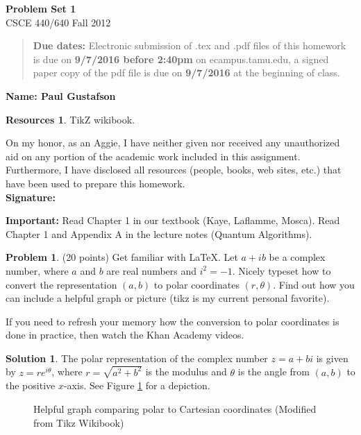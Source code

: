 \documentclass{article}
\theoremstyle{definition}
\newtheorem{problem}{Problem}
\newtheorem*{solution}{Solution}
\newtheorem*{resources}{Resources}
\newcommand{\name}[1]{\noindent\textbf{Name: #1}}
\newcommand{\honor}{\noindent On my honor, as an Aggie, I have neither
  given nor received any unauthorized aid on any portion of the
  academic work included in this assignment. Furthermore, I have
  disclosed all resources (people, books, web sites, etc.) that have
  been used to prepare this homework. \\[1ex]
 \textbf{Signature:} \underline{\hspace*{5cm}} }
\newcommand{\problemset}[1]{\begin{center}\textbf{Problem Set #1}\\ 
CSCE 440/640 Fall 2012\end{center}}
\newcommand{\duedate}[2]{\begin{quote}\textbf{Due dates:} Electronic submission of .tex
    and .pdf files of this homework is due on \textbf{#1} on ecampus.tamu.edu, a signed paper copy
    of the pdf file is due on \textbf{#2} at the beginning of
    class. \end{quote} }
\begin{document}
\problemset{1}
\duedate{9/7/2016 before 2:40pm}{9/7/2016}
\name{Paul Gustafson}
\begin{resources} TikZ wikibook.
\end{resources}
\honor

\newpage

\textbf{Important: } 
Read Chapter 1 in our textbook (Kaye, Laflamme, Mosca). Read Chapter 1
and Appendix A in the lecture notes (Quantum Algorithms). 

\begin{problem} (20 points) Get familiar with \LaTeX. Let $a+ib$ be a
  complex number, where $a$ and $b$ are real numbers and
  $i^2=-1$. Nicely typeset how to convert the representation $(a,b)$
  to polar coordinates $(r,\theta)$. Find out how you can include a
  helpful graph or picture (tikz is my current personal favorite). 

  If you need to refresh your memory how the conversion to polar
  coordinates is done in practice, then watch the Khan Academy
  videos. 
\end{problem}
\begin{solution}
The polar representation of the complex number $z = a + bi$ is given by
$z = r e^{i \theta}$, where $r = \sqrt{a^2 + b^2}$ is the modulus and
$\theta$ is the angle from $(a,b)$ to the positive $x$-axis.  See Figure \ref{fig:help}
for a depiction.
\begin{figure}
\centering
{}
\caption{Helpful graph comparing polar to Cartesian coordinates (Modified from Tikz Wikibook)}
\label{fig:help}
\end{figure}

\end{solution}
\end{document}
